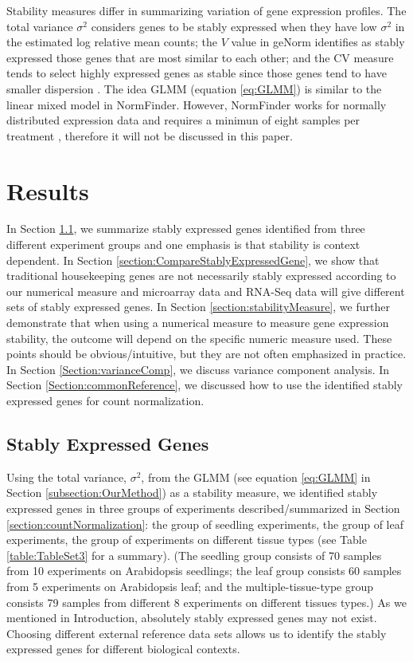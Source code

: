 \documentclass[11pt, a4paper]{article}
\begin{document}
Stability measures differ in summarizing variation of gene expression profiles. The total variance ${\sigma}^2$ considers genes to be stably expressed when they have low ${\sigma}^2$ in the estimated log relative mean
counts; the $V$ value in geNorm identifies as stably
expressed those genes that are most similar to each other; and the CV measure
\citep{czechowski2005genome} tends to select highly expressed genes as stable
since those genes tend to have smaller dispersion \citep{hruz2011refgenes}. The idea GLMM (equation \ref{eq:GLMM}) is similar to the linear mixed model in NormFinder. However, NormFinder works for normally distributed expression data and requires a minimun of eight samples per treatment \citep{andersen2004normalization}, therefore it will not be discussed in this paper. %



\section{Results} \label{section:Results}
In Section \ref{section:stablyExpressedGene}, we summarize stably expressed genes identified from three
different experiment groups and one emphasis is that stability is
context dependent. In Section \ref{section:CompareStablyExpressedGene}, we show that traditional housekeeping
genes are not necessarily stably expressed according to our numerical measure
and microarray data and RNA-Seq data will give different sets of stably
expressed genes.  In Section \ref{section:stabilityMeasure}, we further demonstrate that when using a
numerical measure to measure gene expression stability, the outcome will
depend on the specific numeric measure used.  These points should be
obvious/intuitive, but they are not often emphasized in practice. 
In Section \ref{Section:varianceComp}, we discuss variance component analysis. In Section
\ref{Section:commonReference}, we discussed how to use the identified stably expressed genes for count
normalization.

\subsection{Stably Expressed Genes}\label{section:stablyExpressedGene}
Using the total variance, $\sigma^2$, from the GLMM (see
equation \ref{eq:GLMM} in Section \ref{subsection:OurMethod}) as a
stability measure, we identified stably expressed genes in three groups of
experiments described/summarized in Section \ref{section:countNormalization}: the group of seedling
experiments, the group of leaf experiments, the group of experiments on
different tissue types (see Table \ref{table:TableSet3} for a summary).  (The
seedling group consists of 70 samples from 10 experiments on Arabidopsis
seedlings; the leaf group consists 60 samples from 5 experiments on
Arabidopsis leaf; and the multiple-tissue-type group consists 79 samples from
different 8 experiments on different tissues types.) As we mentioned in
Introduction, absolutely stably expressed genes may not exist.  Choosing
different external reference data sets allows us to identify the stably
expressed genes for different biological contexts.
\end{document}
